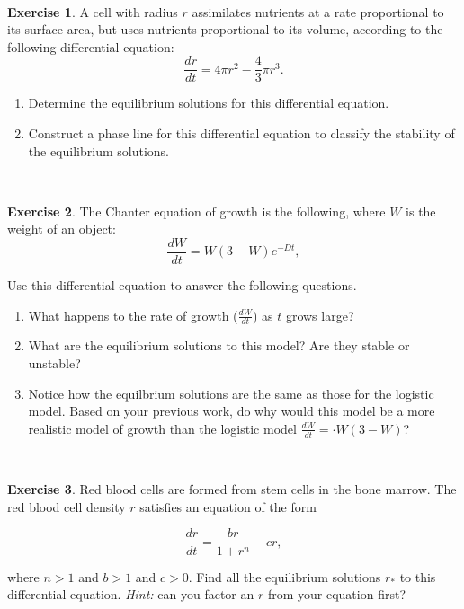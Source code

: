 \documentclass[
]{book}
\theoremstyle{definition}
\theoremstyle{definition}
\theoremstyle{definition}
\newtheorem{exercise}{Exercise}[chapter]
\theoremstyle{remark}
\begin{document}
~

\begin{exercise}
\protect\hypertarget{exr:unnamed-chunk-89}{}{\label{exr:unnamed-chunk-89} }A cell with radius \(r\) assimilates nutrients at a rate proportional to its surface area, but uses nutrients proportional to its volume, according to the following differential equation:
\[ \frac{dr}{dt} =  4 \pi r^{2} -  \frac{4}{3} \pi r^{3}. \]

\begin{enumerate}[label=\alph*.]
\item Determine the equilibrium solutions for this differential equation.
\item Construct a phase line for this differential equation to classify the stability of the equilibrium solutions.
\end{enumerate}
\end{exercise}

~

\begin{exercise}
\protect\hypertarget{exr:unnamed-chunk-90}{}{\label{exr:unnamed-chunk-90} }The Chanter equation of growth is the following, where \(W\) is the weight of an object:
\begin{equation}
\frac{dW}{dt} =  W(3-W)e^{-Dt},
\end{equation}

Use this differential equation to answer the following questions.

\begin{enumerate}[label=\alph*.]
\item What happens to the rate of growth ($\displaystyle  \frac{dW}{dt}$) as $t$ grows large?
\item What are the equilibrium solutions to this model?  Are they stable or unstable?
\item Notice how the equilbrium solutions are the same as those for the logistic model.  Based on your previous work, do why would this model be a more realistic model of growth than the logistic model $\displaystyle  \frac{dW}{dt} = \cdot W(3-W)$?
\end{enumerate}
\end{exercise}

~

\begin{exercise}
\protect\hypertarget{exr:unnamed-chunk-91}{}{\label{exr:unnamed-chunk-91} }Red blood cells are formed from stem cells in the bone marrow. The red blood cell density \(r\) satisfies an equation of the form

\begin{equation}
\frac{dr}{dt} = \frac{br}{1+r^{n}} - c r,
\end{equation}

where \(n>1\) and \(b>1\) and \(c>0\). Find all the equilibrium solutions \(r_{*}\) to this differential equation. \emph{Hint:} can you factor an \(r\) from your equation first?
\end{exercise}
~
\end{document}

